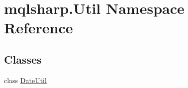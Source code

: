 \hypertarget{namespacemqlsharp_1_1_util}{}\section{mqlsharp.\+Util Namespace Reference}
\label{namespacemqlsharp_1_1_util}
\subsection*{Classes}
\begin{DoxyCompactItemize}
\item 
class \hyperlink{classmqlsharp_1_1_util_1_1_date_util}{Date\+Util}
\end{DoxyCompactItemize}
